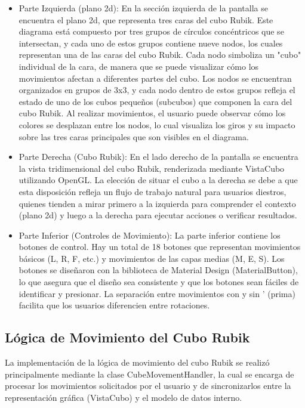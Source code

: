                                                                                                                                                                                                                                                                                                                                                                                                                                                                                                                                                                                                                                                                                                                                                                                                                                                                                                                                                                                                                                                                                                                                                                                                                                                                                                                                                                                                                                                                                                                                                                                                                                                                                                                                                                                                                                                                                                                                                                                                                                                                                                                                                                                                                                                                                                                                                                                                                                                                                                                                                                                                                                                                                                                                                                                                                                                                                                                                                                                                                                                                                                                                                                                                                                                                                                                                                                                                                                                                                                                                                                                                                                                                                                                                                                                                                                                                                                                                                                                                                                                                                                                                                                                                                                                                                                                                                                                                                                                                                                                                                                                                                                                                                                                                                                                                                                                                                                                                                                                                                                                                                                                                                                                                                                                                                                                                                                                                                                                                                                                                                                                                                                                                                                                                                                                                                                                                                                                                                                                                                                                                                                                                                                                                                                                                                                                                                                                                                                                                                                                                                                                                                                                                                                                                                                                                                                                                                                                                                                                                                                                                                                                                                                                                                                                                                                                                                                                                                                                                                                                                                                                                                                                                                                                                                                                                                                                                                                                                                                                                                                                                                                                                                                                                                                                                                                                                                                                                                                                                                                                                                                                                                                                                                                                                                                                                                                                                                                                                                                                                                                                                                                                                                                                                                                                                                                                                                                                                                                                                                                                                                                                                                                                                                                                                                                                                                                                                                                                                                                                                                                                                                                                                                                                                                                                                                                                                                                                                                                                                                                                                                                                                                                                                                                                                                                                                                                                                                                                                                                                                                                                                                                                                                                                                                                                                                                                                                                                                                                                                                                                                                                                                                                                                                                                                                                                                                                                                                                                                                                                                                                                                                                                                                                                                                                                                                                                                                                                                                                                                                                                                                                                                                                                                                                                                                                                                                                                                                                                                                                                                                                                                                                                                                                                                                                                                                                                                                                                                                                                                                                                                                                                                                                                                                                                                                                                                                                                                                                                                                                                                                                                                                                                                                                                                                                                                                                                                                                                                                                                                                                                                                                                                                                                                                                                                                                                                                                                                                                                                                                                                                                                                                                                                                                                                                                                                                                                                                                                                                                                                                                                                                                                                                                                                                                                                                                                                                                                                                                                                                                                                                                                                                                                                                                                                                                                                                                                                                                                                                                                                                                                                                                                                                                                                                                                                                                                                                                                                                                                                                                                                                                                                                                                                                                                                                                                                                                                                                                                                                                                                                                                                                                                                                                                                                                                                                                                                                                                                                                                                                                                                                                                                                                                                                                                                                                                                                                                                                                                                                                                                                                                                                                                                                                                                                                                                                                                                                                                                                                                                                                                                                                                                                                                                                                                                                                                                                                                                                                                                                                                                                                                                                                                                                                                                                                                                                                                                                                                                                                                                                                                                                                                                                                                                                                                                                                                                                                                                                                                                                                                                                                                                                                                                                                                                                                                                                                                                                                                                                                                                                                                                                                                                                                                                                                                                                                                                                                                                                                                                                                                                                                                                                                                                                                                                                                                                                                                                                                                                                                                                                                                                                                                                                                                                                                                                                                                                                                                                                                                                                                                                                                                                                                                                                                                                                                                                                                                                                                                                                                                                                                                                                                                                                                                                                                                                                                                                                                                                                                                                                                                                                                                                                                                                                                                                                                                                                                                                                                                                                                                                                                                                                                                                                                                                                                                                                                                                                                                                                                                                                                                                                                                                                                                                                                                                                                                                                                                                                                                                                                                                                                                                                                                                                                                                                                                                                                                                                                                                                                                                                                                                                                                                                                                                                                                                                                                                                                                                                                                                                                                                                                                                                                                                                                                                                                                                                                                                                                                                                                                                                                                                                                                                                                                                                                                                                                                                                                                                                                                                                                                                                                                                                                                                                                                                                                                                                                                                                                                                                                                                                                                                                                                                                                                                                                                                                                                                                                                                                                                                                                                                                                                                                                                                                                                                                                                                                                                                                                                                                                                                                                                                                                                                                                                                                                                                                                                                                                                                                                                                                                                                                                                                                                                                                                                                                                                                                                                                                                                                                                                                                                                                                                                                                                                                                                                                                                                                                                                                                                                                                                                                                                                                                                                                                                                                                                                                                                                                                                                                                                                                                                                                                                                                                                                                                                                                                                                                                                                                                                                                                                                                                                                                                                                                                                                                                                                                                                                                                                                                                                                                                                                                                                                                                                                                                                                                                                                                                                                                                                                                                                                                                                                                                                                                                                                                                                                                                                                                                                                                                                                                                                                                                                                                                                                                                                                                                                                                                                                                                                                                                                                                                                                                                                                                                                                                                                                                                                                                                                                                                                                                                                                                                                                                                                                                                                                                                                                                                                                                                                                                                                                                                                                                                                                                                                                                                                                                                                                                                                                                                                                                                                                                                                                                                                                                                                                                                                                                                                                                                                                                                                                                                                                                                                                                                                                                                                                                                                                                                                                                                                                                                                                                                                                                                                                                                                                                                                                                                                                                                                                                                                                                                                                                                                                                                                                                                                                                                                                                                                                                                                                                                                                                                                                                                                                                                                                                                                                                                                                                                                                                                                                                                                                                                                                                                                                                                                                                                                                                                                                                                                                                                                                                                                                                                                                                                                                                                                                                                                                                                                                                                                                                                                                                                                                                                                                                                                                                                                                                                                                                                                                                                                                                                                                                                                                                                                                                                                                                                                                                                                                                                                                                                                                                                                                                                                                                                                                                                                                                                                                                                                                                                                                                                                                                                                                                                                                                                                                                                                                                                                                                                                                                                                                                                                                                                                                                                                                                                                                                                                                                                                                                                                                                                                                                                                                                                                                                                                                                                                                                                                                                                                                                                                                                                                                                                                                                                                                                                                                                                                                                                                                                                                                                                                                                                                                                                                                                                                                                                                                                                                                                                                                                                                                                                                                                                                                                                                                                                                                                                                                                                                                                                                                                                                                                                                                                                                                                                                                                                                                                                                                                                                                                                                                                                                                                                                                                                                                                                                                                                                                                                                                                                                                                                                                                                                                                                                                                                                                                                                                                                                                                                                                                                                                                                                                                                                                                                                                                                                                                                                                                                                                                                                                                                                                                                                                                                                                                                                                                                                                                                                                                                                                                                                                                                                                                                                                                                                                                                                                                                                                                                                                                                                                                                                                                                                                                                                                                                                                                                                                                                                                                                                                                                                                                                                                                                                                                                                                                                                                                                                                                                                                                                                                                                                                                                                                                                                                                                                                                                                                                                                                                                                                                                                                \documentclass[conference]{IEEEtran}
\begin{document}
\begin{itemize}
    \item Parte Izquierda (plano 2d): En la sección izquierda de la pantalla se encuentra el plano 2d, que representa tres caras del cubo Rubik. Este diagrama está compuesto por tres grupos de círculos concéntricos que se intersectan, y cada uno de estos grupos contiene nueve nodos, los cuales representan una de las caras del cubo Rubik. Cada nodo simboliza un "cubo" individual de la cara, de manera que se puede visualizar cómo los movimientos afectan a diferentes partes del cubo. Los nodos se encuentran organizados en grupos de 3x3, y cada nodo dentro de estos grupos refleja el estado de uno de los cubos pequeños (subcubos) que componen la cara del cubo Rubik. Al realizar movimientos, el usuario puede observar cómo los colores se desplazan entre los nodos, lo cual visualiza los giros y su impacto sobre las tres caras principales que son visibles en el diagrama.
    \item Parte Derecha (Cubo Rubik): En el lado derecho de la pantalla se encuentra la vista tridimensional del cubo Rubik, renderizada mediante VistaCubo utilizando OpenGL. La elección de situar el cubo a la derecha se debe a que esta disposición refleja un flujo de trabajo natural para usuarios diestros, quienes tienden a mirar primero a la izquierda para comprender el contexto (plano 2d) y luego a la derecha para ejecutar acciones o verificar resultados.
    \item Parte Inferior (Controles de Movimiento): La parte inferior contiene los botones de control. Hay un total de 18 botones que representan movimientos básicos (L, R, F, etc.) y movimientos de las capas medias (M, E, S). Los botones se diseñaron con la biblioteca de Material Design (MaterialButton), lo que asegura que el diseño sea consistente y que los botones sean fáciles de identificar y presionar. La separación entre movimientos con y sin ' (prima) facilita que los usuarios diferencien entre rotaciones. \newline
\end{itemize} 

\subsection{Lógica de Movimiento del Cubo Rubik} 
La implementación de la lógica de movimiento del cubo Rubik se realizó principalmente mediante la clase CubeMovementHandler, la cual se encarga de procesar los movimientos solicitados por el usuario y de sincronizarlos entre la representación gráfica (VistaCubo) y el modelo de datos interno.
\end{document}
